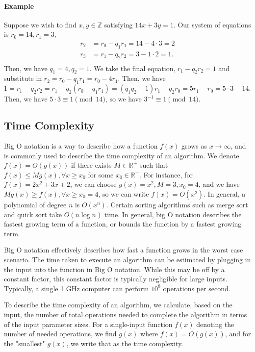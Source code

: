 \documentclass{article}
\newcommand{\R}{\mathbb{R}}
\newcommand{\Z}{\mathbb{Z}}
\begin{document}
\paragraph{Example} Suppose we wish to find $x, y \in \Z$ satisfying $14 x + 3 y = 1$. Our system of equations is $r_0 = 14, r_1 = 3,$
\begin{align*}
    r_2 &= r_0 - q_1 r_1 = 14 - 4 \cdot 3 = 2 \\
    r_3 &= r_1 - q_2 r_2 = 3 - 1 \cdot 2 = 1. \\
\end{align*}
Then, we have $q_1 = 4, q_2 = 1$. We take the final equation, $r_1 - q_2 r_2 = 1$ and substitute in $r_2 = r_0 - q_1 r_1 = r_0 - 4 r_1$. Then, we have $1 = r_1 - q_2 r_2 = r_1 - q_2 (r_0 - q_1 r_1) = (q_1 q_2+1) r_1 - q_2 r_0 = 5 r_1 - r_0 = 5 \cdot 3 - 14.$ Then, we have $5 \cdot 3 \equiv 1 \pmod{14}$, so we have $3^{-1} \equiv 1 \pmod{14}.$
\subsection{Time Complexity}
Big O notation is a way to describe how a function $f(x)$ grows as $x \to \infty$, and is commonly used to describe the time complexity of an algorithm. We denote $f(x) = O(g(x))$ if there exists $M \in \R^+$ such that $f(x) \le M g(x), \forall x \ge x_0$ for some $x_0 \in \R^+$. For instance, for $f(x)=2x^2 +3x+2$, we can choose $g(x)=x^2, M = 3, x_0 = 4$, and we have $M g(x) \ge f(x), \forall x \ge x_0 = 4$, so we can write $f(x) = O(x^2)$. In general, a polynomial of degree $n$ is $O(x^n)$. Certain sorting algorithms such as merge sort and quick sort take $O(n \log n)$ time. In general, big O notation describes the fastest growing term of a function, or bounds the function by a fastest growing term.

Big O notation effectively describes how fast a function grows in the worst case scenario. The time taken to execute an algorithm can be estimated by plugging in the input into the function in Big O notation. While this may be off by a constant factor, this constant factor is typically negligible for large inputs. Typically, a single 1 GHz computer can perform $10^8$ operations per second.

To describe the time complexity of an algorithm, we calculate, based on the input, the number of total operations needed to complete the algorithm in terms of the input parameter sizes. For a single-input function $f(x)$ denoting the number of needed operations, we find $g(x)$ where $f(x)=O(g(x))$, and for the "smallest" $g(x)$, we write that as the time complexity.
\end{document}
